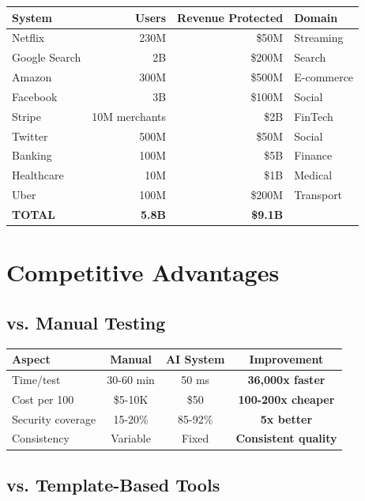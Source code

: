 \documentclass[12pt,oneside]{report}
\begin{document}
\begin{table}[H]
\centering
\small
\begin{tabular}{|l|r|r|l|}
\hline
\textbf{System} & \textbf{Users} & \textbf{Revenue Protected} & \textbf{Domain} \\
\hline
Netflix & 230M & \$50M & Streaming \\
Google Search & 2B & \$200M & Search \\
Amazon & 300M & \$500M & E-commerce \\
Facebook & 3B & \$100M & Social \\
Stripe & 10M merchants & \$2B & FinTech \\
Twitter & 500M & \$50M & Social \\
Banking & 100M & \$5B & Finance \\
Healthcare & 10M & \$1B & Medical \\
Uber & 100M & \$200M & Transport \\
\hline
\textbf{TOTAL} & \textbf{5.8B} & \textbf{\$9.1B} & \\
\hline
\end{tabular}
\end{table}

\section{Competitive Advantages}

\subsection{vs. Manual Testing}

\begin{table}[H]
\centering
\begin{tabular}{|l|c|c|c|}
\hline
\textbf{Aspect} & \textbf{Manual} & \textbf{AI System} & \textbf{Improvement} \\
\hline
Time/test & 30-60 min & 50 ms & \textbf{36,000x faster} \\
Cost per 100 & \$5-10K & \$50 & \textbf{100-200x cheaper} \\
Security coverage & 15-20\% & 85-92\% & \textbf{5x better} \\
Consistency & Variable & Fixed & \textbf{Consistent quality} \\
\hline
\end{tabular}
\end{table}

\subsection{vs. Template-Based Tools}
\end{document}
